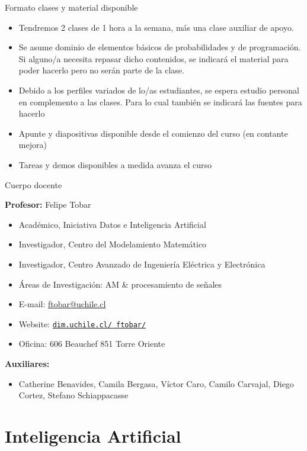 \documentclass[9pt]{beamer}
\begin{document}
\begin{frame}{Formato clases y material disponible}


\begin{itemize}
  \item Tendremos 2 clases de 1 hora a la semana, más una clase auxiliar de apoyo. 
  \item Se asume dominio de elementos básicos de probabilidades y de programación. Si alguno/a necesita repasar dicho contenidos, se indicará el material para poder hacerlo pero no serán parte de la clase. 
  \item Debido a los perfiles variados de lo/as estudiantes, se espera estudio personal en complemento a las clases. Para lo cual también se indicará las fuentes para hacerlo
  \item Apunte y diapositivas disponible desde el comienzo del curso (en contante mejora)
  \item Tareas y demos disponibles a medida avanza el curso
\end{itemize}
\vfill


\end{frame}


\begin{frame}{Cuerpo docente}

\textbf{Profesor:} Felipe Tobar
\begin{itemize}
  \item Académico, Iniciativa Datos e Inteligencia Artificial 
  \item Investigador, Centro del Modelamiento Matemático 
  \item Investigador, Centro Avanzado de Ingeniería Eléctrica y Electrónica
  \item Áreas de Investigación: AM \& procesamiento de señales
  \item E-mail: \url{ftobar@uchile.cl}
  \item Website: \href{http://www.dim.uchile.cl/~ftobar/}{\tt dim.uchile.cl/~ftobar/} 
  \item Oficina: 606 Beauchef 851 Torre Oriente
\end{itemize}

\vfill
\textbf{Auxiliares:}
\begin{itemize}
  \item Catherine Benavides, Camila Bergasa, Víctor Caro, Camilo Carvajal, Diego Cortez, Stefano Schiappacasse
\end{itemize}


\end{frame}
\section{Inteligencia Artificial}
\end{document}
